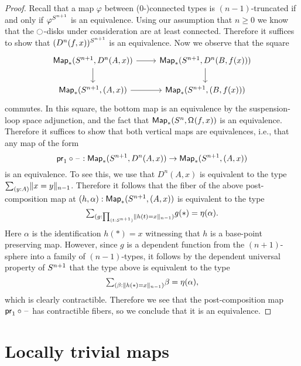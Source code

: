 \documentclass[9pt,twosided]{amsart}
\begin{document}
\begin{proof}
  Recall that a map $\varphi$ between ($0$-)connected types is $(n-1)$-truncated if and only if $\varphi^{S^{n+1}}$ is an equivalence. Using our assumption that $n\geq 0$ we know that the ${\ocircle}$-disks under consideration are at least connected. Therefore it suffices to show that $(D^{n}(f,x))^{S^{n+1}}$ is an equivalence. Now we observe that the square
  \begin{equation*}
    \begin{tikzcd}
      \mathsf{Map}_\ast(\sphere{n+1},D^{n}(A,x)) \arrow[r] \arrow[d] & \mathsf{Map}_\ast(\sphere{n+1},D^{n}(B,f(x))) \arrow[d] \\
      \mathsf{Map}_\ast(\sphere{n+1},(A,x)) \arrow[r] & \mathsf{Map}_\ast(\sphere{n+1},(B,f(x)))
    \end{tikzcd}
  \end{equation*}
  commutes. In this square, the bottom map is an equivalence by the suspension-loop space adjunction, and the fact that $\mathsf{Map}_\ast(S^{n},\mathsf{\Omega}^{}(f,x))$ is an equivalence. Therefore it suffices to show that both vertical maps are equivalences, i.e., that any map of the form
  \begin{equation*}
    \mathsf{pr}_{1}\circ\mathord{\hspace{1pt}\text{--}\hspace{1pt}} : \mathsf{Map}_\ast(S^{n+1},D^{n}(A,x))\to \mathsf{Map}_\ast(S^{n+1},(A,x))
  \end{equation*}
  is an equivalence. To see this, we use that $D^n(A,x)$ is equivalent to the type $\sm{y:A}\trunc{n-1}{x=y}$. Therefore it follows that the fiber of the above post-composition map at $(h,\alpha):\mathsf{Map}_\ast(S^{n+1},(A,x))$ is equivalent to the type
  \begin{equation*}
    \sm{g:\prd{t:\sphere{n+1}}\trunc{n-1}{h(t)=x}}g(\ast)=\eta(\alpha).
  \end{equation*}
  Here $\alpha$ is the identification $h(\ast)=x$ witnessing that $h$ is a base-point preserving map. However, since $g$ is a dependent function from the $(n+1)$-sphere into a family of $(n-1)$-types, it follows by the dependent universal property of $S^{n+1}$ that the type above is equivalent to the type
  \begin{equation*}
    \sm{\beta:\trunc{n-1}{h(\ast)=x}}\beta=\eta(\alpha),
  \end{equation*}
  which is clearly contractible. Therefore we see that the post-composition map $\mathsf{pr}_{1}\circ\mathord{\hspace{1pt}\text{--}\hspace{1pt}}$ has contractible fibers, so we conclude that it is an equivalence.
\end{proof}

\section{Locally trivial maps}
\end{document}
